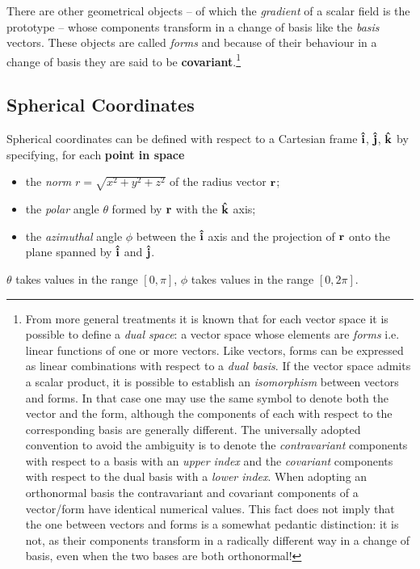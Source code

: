 There are other geometrical objects -- of which the \textit{gradient} of a scalar field is the prototype -- whose components transform in a change of basis like the \textit{basis} vectors. These objects are called \textit{forms} and because of their behaviour in a change of basis they are said to be \textbf{covariant}.\footnote{From more general treatments it is known that for each vector space it is possible to define a \textit{dual space}: a vector space whose elements are \textit{forms} i.e. linear functions of one or more vectors. Like vectors, forms can be expressed as linear combinations with respect to a \textit{dual basis}. If the vector space admits a scalar product, it is possible to establish an \textit{isomorphism} between vectors and forms. In that case one may use the same symbol to denote both the vector and the form, although the components of each with respect to the corresponding basis are generally different. The universally adopted convention to avoid the ambiguity is to denote the \textit{contravariant} components with respect to a basis with an \textit{upper index} and the \textit{covariant} components with respect to the dual basis with a \textit{lower index}. 
When adopting an orthonormal basis the contravariant and covariant components of a vector/form have identical numerical values. This fact does not imply that the one between vectors and forms is a somewhat pedantic distinction: it is not, as their components transform in a radically different way in a change of basis, even when the two bases are both orthonormal!}

\subsection{Spherical Coordinates}
Spherical coordinates can be defined with respect to a Cartesian frame $\vu{i}$, $\vu{j}$, $\vu{k}$ by specifying, for each \textbf{point in space}
\begin{itemize}
\item the \textit{norm} $r = \sqrt{x^2 + y^2 + z^2}$ of the radius vector $\vb{r}$; 
\item the \textit{polar} angle $\theta$ formed by $\vb{r}$ with the $\vu{k}$ axis;
\item the \textit{azimuthal} angle $\phi$ between the $\vu{i}$ axis and the projection of $\vb{r}$ onto the plane spanned by $\vu{i}$ and $\vu{j}$.
\end{itemize}
$\theta$ takes values in the range $[0, \pi]$, $\phi$ takes values in the range $[0, 2\pi]$.

